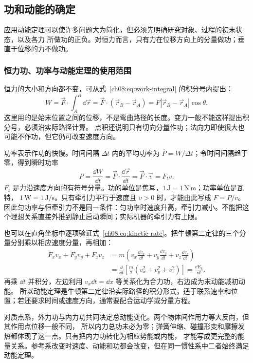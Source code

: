 {\subsection{功和动能的确定}

应用动能定理可以使许多问题大为简化，但必须先明确研究对象、过程的初末状态，以及各力
所做功的正负。对恒力而言，只有力在位移方向上的分量做功；垂直于位移的力不做功。

\subsubsection*{恒力功、功率与动能定理的使用范围}

恒力的大小和方向都不变，可从式~\eqref{ch08:eq:work-integral} 的积分号内提出：
\[
 W=\vec F\cdot\int_A^B\dd\vec r
  =\vec F\cdot(\vec r_B-\vec r_A)=F|\vec r_B-\vec r_A|\cos\theta.
\]
这里用的是始末位置之间的位移，不是弯曲路径的长度。变力一般不能这样提出积分号，必须沿实际路径计算。
点积还说明只有切向分量作功；法向力即使很大也可能不作功，但它仍可改变速度方向。

功率表示作功的快慢。时间间隔 $\Delta t$ 内的平均功率为 $\overline P=W/\Delta t$；令时间间隔趋于零，得到瞬时功率
\begin{equation}
 P=\frac{\dd W}{\dd t}
 =\vec F\cdot\frac{\dd\vec r}{\dd t}
 =\vec F\cdot\vec v=F_t v.
 \label{ch08:eq:power}
\end{equation}
$F_t$ 是力沿速度方向的有符号分量。功的单位是焦耳，$1\,\mathrm J=1\,\mathrm{N\,m}$；功率单位是瓦特，
$1\,\mathrm W=1\,\mathrm{J/s}$。只有牵引力平行于速度且 $v>0$ 时，才能由此写成 $F=P/v$。
因此匀功率与恒牵引力不是同一条件：匀功率时速度升高，牵引力减小。不能把这个理想关系直接外推到静止启动瞬间；实际机器的牵引力有上限。

也可以在直角坐标中逐项验证式~\eqref{ch08:eq:kinetic-rate}。把牛顿第二定律的三个分量分别乘以相应速度分量，再相加：
\begin{align*}
 F_xv_x+F_yv_y+F_zv_z
 &=m\left(v_x\frac{\dd v_x}{\dd t}+v_y\frac{\dd v_y}{\dd t}+v_z\frac{\dd v_z}{\dd t}\right)\\
 &=\frac{\dd}{\dd t}\left[\frac m2(v_x^2+v_y^2+v_z^2)\right]
 =\frac{\dd E_k}{\dd t}.
\end{align*}
再乘 $\dd t$ 并积分，左边利用 $v_x\dd t=\dd x$ 等关系化为合力功，右边成为末动能减初动能。
所以动能定理是牛顿第二定律沿实际路径的积分形式，适于联系速率和位置；若还要求时间或速度方向，通常要配合运动学或分量方程。

对质点系，外力功与内力功共同决定总动能变化。两个物体间作用力等大反向，但其作用点位移一般不同，
所以内力总功未必为零；弹簧伸缩、碰撞形变和摩擦发热都体现了这一点。只有把内力功转化为相应势能或内能，
才能写成更完整的能量关系。参考系改变时速度、动能和功都会改变，但在同一惯性系中二者始终满足动能定理。

}
